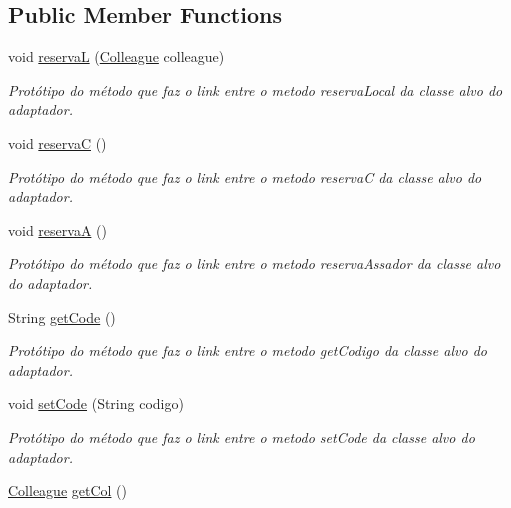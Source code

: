 \subsection*{Public Member Functions}
\begin{DoxyCompactItemize}
\item 
void \mbox{\hyperlink{interfaceadapter_pattern_1_1game_target_a663405a3d10988de25c6ea3ef63c68eb}{reservaL}} (\mbox{\hyperlink{classmediator_pattern_1_1_colleague}{Colleague}} colleague)
\begin{DoxyCompactList}\small\item\em Protótipo do método que faz o link entre o metodo reserva\+Local da classe alvo do adaptador. \end{DoxyCompactList}\item 
void \mbox{\hyperlink{interfaceadapter_pattern_1_1game_target_ae8c1c944929700a3e120e641118c9188}{reservaC}} ()
\begin{DoxyCompactList}\small\item\em Protótipo do método que faz o link entre o metodo reservaC da classe alvo do adaptador. \end{DoxyCompactList}\item 
void \mbox{\hyperlink{interfaceadapter_pattern_1_1game_target_a67348260f14d11e317195e2d66dbff18}{reservaA}} ()
\begin{DoxyCompactList}\small\item\em Protótipo do método que faz o link entre o metodo reserva\+Assador da classe alvo do adaptador. \end{DoxyCompactList}\item 
String \mbox{\hyperlink{interfaceadapter_pattern_1_1game_target_a32fce3f3dd420116a031b051f2464304}{get\+Code}} ()
\begin{DoxyCompactList}\small\item\em Protótipo do método que faz o link entre o metodo get\+Codigo da classe alvo do adaptador. \end{DoxyCompactList}\item 
void \mbox{\hyperlink{interfaceadapter_pattern_1_1game_target_a9ea61c0d011aa457f9a8c887d086044a}{set\+Code}} (String codigo)
\begin{DoxyCompactList}\small\item\em Protótipo do método que faz o link entre o metodo set\+Code da classe alvo do adaptador. \end{DoxyCompactList}\item 
\mbox{\hyperlink{classmediator_pattern_1_1_colleague}{Colleague}} \mbox{\hyperlink{interfaceadapter_pattern_1_1game_target_ad3fc8b4c4a732bcc875071ed0c081261}{get\+Col}} ()

\end{DoxyCompactItemize}
